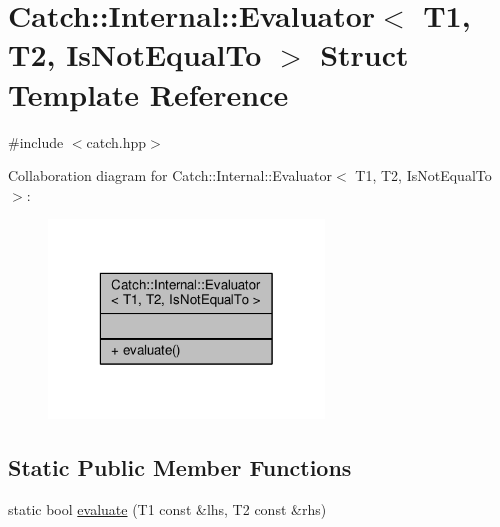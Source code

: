 \hypertarget{struct_catch_1_1_internal_1_1_evaluator_3_01_t1_00_01_t2_00_01_is_not_equal_to_01_4}{\section{Catch\-:\-:Internal\-:\-:Evaluator$<$ T1, T2, Is\-Not\-Equal\-To $>$ Struct Template Reference}
\label{struct_catch_1_1_internal_1_1_evaluator_3_01_t1_00_01_t2_00_01_is_not_equal_to_01_4}
}


{\ttfamily \#include $<$catch.\-hpp$>$}



Collaboration diagram for Catch\-:\-:Internal\-:\-:Evaluator$<$ T1, T2, Is\-Not\-Equal\-To $>$\-:
\nopagebreak
\begin{figure}[H]
\begin{center}
\leavevmode
\includegraphics[width=208pt]{struct_catch_1_1_internal_1_1_evaluator_3_01_t1_00_01_t2_00_01_is_not_equal_to_01_4__coll__graph}
\end{center}
\end{figure}
\subsection*{Static Public Member Functions}
\begin{DoxyCompactItemize}
\item 
static bool \hyperlink{struct_catch_1_1_internal_1_1_evaluator_3_01_t1_00_01_t2_00_01_is_not_equal_to_01_4_a956a12d0f4a7dceb5a1ce914421ff945}{evaluate} (T1 const \&lhs, T2 const \&rhs)
\end{DoxyCompactItemize}


